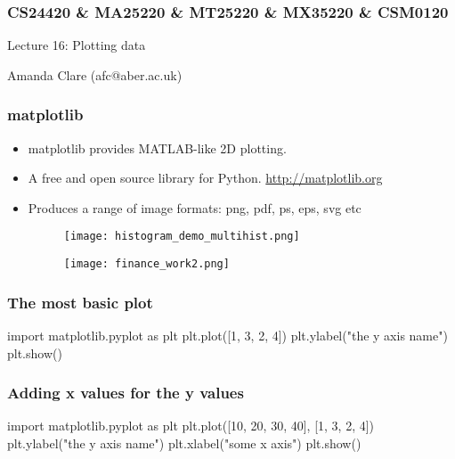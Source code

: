 \documentclass{beamer}
\begin{document}

\begin{frame}
\frametitle{CS24420 \& MA25220 \& MT25220 \& MX35220 \& CSM0120}

\begin{center}
\begin{huge}
Lecture 16: Plotting data
\end{huge}
\bigskip

Amanda Clare (afc@aber.ac.uk)

\end{center}
\end{frame}


\begin{frame}[fragile]
\frametitle{matplotlib}
\begin{itemize}
\item matplotlib provides MATLAB-like 2D plotting.
\item A free and open source library for Python. \url{http://matplotlib.org}
\item Produces a range of image formats: png, pdf, ps, eps, svg etc
\begin{figure}
        \centering
        \begin{minipage}{.5\textwidth}
            \centering
            \texttt{[image: histogram\_demo\_multihist.png]}
       \end{minipage}%
        \begin{minipage}{.5\textwidth}
            \centering
            \texttt{[image: finance\_work2.png]}
       \end{minipage}
   \end{figure}
\end{itemize}

\end{frame}

\begin{frame}[fragile]
\frametitle{The most basic plot}
\begin{code}
import matplotlib.pyplot as plt
plt.plot([1, 3, 2, 4])
plt.ylabel("the y axis name")
plt.show()
\end{code}
\end{frame}

\begin{frame}[fragile]
\frametitle{Adding x values for the y values}
\begin{code}
import matplotlib.pyplot as plt
plt.plot([10, 20, 30, 40], [1, 3, 2, 4])
plt.ylabel("the y axis name")
plt.xlabel("some x axis")
plt.show()
\end{code}
\end{frame}
\end{document}
